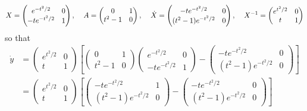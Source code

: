 \documentclass{article}
\begin{document}
\begin{itemize}
    \[X = \begin{pmatrix}
        e^{-t^2/2} & 0\\
        -te^{-t^2/2} & 1
    \end{pmatrix}, \hspace{0.4cm} A = \begin{pmatrix}
        0 & 1\\
        t^2 - 1 & 0
    \end{pmatrix}, \hspace{0.4cm} \dot{X} = \begin{pmatrix}
        -te^{-t^2/2} & 0\\
        (t^2 - 1)e^{-t^2/2} & 0
    \end{pmatrix}, \hspace{0.4cm} X^{-1} = \begin{pmatrix}
        e^{t^2/2} & 0\\
        t & 1
    \end{pmatrix}\]
    so that
    \begin{align*}
        \dot{y} &= \begin{pmatrix}
            e^{t^2/2} & 0\\
        t & 1
        \end{pmatrix}
        \left[\begin{pmatrix}
        0 & 1\\
        t^2 - 1 & 0
    \end{pmatrix}\begin{pmatrix}
        e^{-t^2/2} & 0\\
        -te^{-t^2/2} & 1
    \end{pmatrix} - \begin{pmatrix}
        -te^{-t^2/2} & 0\\
        (t^2 - 1)e^{-t^2/2} & 0
    \end{pmatrix}\right]\\
    & = \begin{pmatrix}
            e^{t^2/2} & 0\\
            t & 1
        \end{pmatrix}\left[\begin{pmatrix}
            -te^{-t^2/2} & 1\\
            (t^2 - 1)e^{-t^2/2} & 0
        \end{pmatrix} - \begin{pmatrix}
            -te^{-t^2/2} & 0\\
            (t^2 - 1)e^{-t^2/2} & 0
        \end{pmatrix}\right]\\

\end{align*}
\end{itemize}
\end{document}
